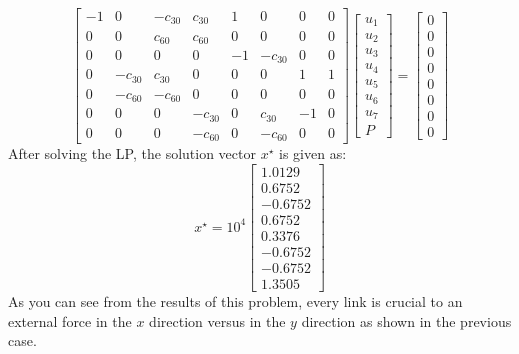 \documentclass[12pt]{article}
\begin{document}
\begin{equation}
\left[
\begin{array}{cccccccc}
-1  & 0             & -c_{30}  &  c_{30}   &1     &0            &0   &0\\
0   & 0             &c_{60}     &c_{60}     &0     &0            &0   &0\\
0   &0              &0              &0              &-1    &-c_{30}  &0   &0\\
0   &-c_{30}   &c_{30}     &0              &0     &0             &1   &1\\
0   &-c_{60}   &-c_{60}    &0              &0    &0              &0   &0\\
0   & 0             &0              &-c_{30}    &0    &c_{30}    &-1  &0\\
0   &0              &0              &-c_{60}    &0    &-c_{60}   &0   &0 
\end{array}
\right]
\left[
\begin{array}{c}
u_1\\
u_2\\
u_3\\
u_4\\
u_5\\
u_6\\
u_7\\
P
\end{array}
\right]
=
\left[
\begin{array}{c}
0\\
0\\
0\\
0\\
0\\
0\\
0\\
0
\end{array}
\right]
\end{equation}
After solving the LP, the solution vector $x^\star$ is given as:
\begin{equation}
\nonumber
x^\star = 10^4
\left[
\begin{array}{r}
    1.0129\\
    0.6752\\
   -0.6752\\
    0.6752\\
    0.3376\\
   -0.6752\\
   -0.6752\\
    1.3505
\end{array}
\right]
\end{equation}
As you can see from the results of this problem, every link is crucial to an external force in the $x$ direction versus in the $y$ direction as shown in the previous case.
\end{document}
